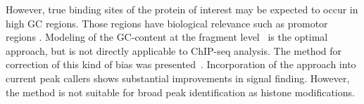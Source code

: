 However, true binding sites of the protein of interest may be expected to occur in high GC regions.
Those regions have biological relevance such as promotor regions
.
Modeling of the GC-content at the fragment level~\cite{benjamini2012summarizing} is the optimal approach, but is not directly applicable to ChIP-seq analysis.
The method for correction of this kind of bias was presented~\cite{teng2017accounting}.
Incorporation of the approach into current peak callers shows substantial improvements in signal finding.
However, the method is not suitable for broad peak identification as histone modifications.







